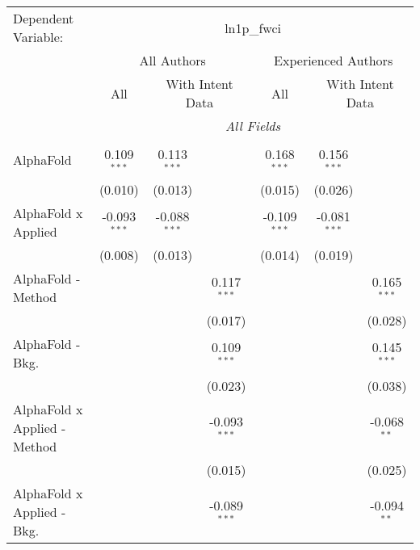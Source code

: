 \begingroup
\centering
\begin{tabular}{lcccccc}
   \tabularnewline \midrule \midrule
   Dependent Variable: & \multicolumn{6}{c}{ln1p\_fwci}\\
 & \multicolumn{3}{c}{All Authors} & \multicolumn{3}{c}{Experienced Authors} \\
\cmidrule(lr){2-4} \cmidrule(lr){5-7}
 & \multicolumn{1}{c}{All} & \multicolumn{2}{c}{With Intent Data} & \multicolumn{1}{c}{All} & \multicolumn{2}{c}{With Intent Data} \\
\cmidrule(lr){2-2} \cmidrule(lr){3-4} \cmidrule(lr){5-5} \cmidrule(lr){6-7}
 & \multicolumn{6}{c}{\textit{All Fields}} \\ \\
   AlphaFold                      & 0.109$^{***}$  & 0.113$^{***}$  &                & 0.168$^{***}$  & 0.156$^{***}$  &   \\   
                                  & (0.010)        & (0.013)        &                & (0.015)        & (0.026)        &   \\   
   AlphaFold x Applied            & -0.093$^{***}$ & -0.088$^{***}$ &                & -0.109$^{***}$ & -0.081$^{***}$ &   \\   
                                  & (0.008)        & (0.013)        &                & (0.014)        & (0.019)        &   \\   
   AlphaFold - Method             &                &                & 0.117$^{***}$  &                &                & 0.165$^{***}$\\   
                                  &                &                & (0.017)        &                &                & (0.028)\\   
   AlphaFold - Bkg.               &                &                & 0.109$^{***}$  &                &                & 0.145$^{***}$\\   
                                  &                &                & (0.023)        &                &                & (0.038)\\   
   AlphaFold x Applied - Method   &                &                & -0.093$^{***}$ &                &                & -0.068$^{**}$\\   
                                  &                &                & (0.015)        &                &                & (0.025)\\   
   AlphaFold x Applied - Bkg.     &                &                & -0.089$^{***}$ &                &                & -0.094$^{**}$\\   

\end{tabular}
